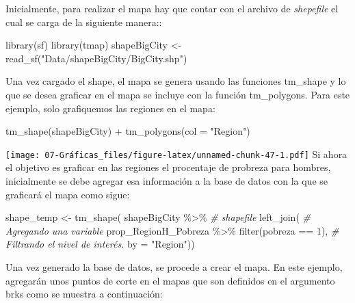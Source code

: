 \documentclass[
  12pt,
]{book}
\newenvironment{Shaded}{\begin{snugshade}}{\end{snugshade}}
\newcommand{\AttributeTok}[1]{\textcolor[rgb]{0.77,0.63,0.00}{#1}}
\newcommand{\CommentTok}[1]{\textcolor[rgb]{0.56,0.35,0.01}{\textit{#1}}}
\newcommand{\DecValTok}[1]{\textcolor[rgb]{0.00,0.00,0.81}{#1}}
\newcommand{\FunctionTok}[1]{\textcolor[rgb]{0.00,0.00,0.00}{#1}}
\newcommand{\NormalTok}[1]{#1}
\newcommand{\OtherTok}[1]{\textcolor[rgb]{0.56,0.35,0.01}{#1}}
\newcommand{\SpecialCharTok}[1]{\textcolor[rgb]{0.00,0.00,0.00}{#1}}
\newcommand{\StringTok}[1]{\textcolor[rgb]{0.31,0.60,0.02}{#1}}
\begin{document}
Inicialmente, para realizar el mapa hay que contar con el archivo de \emph{shepefile} el cual se carga de la siguiente manera::

\begin{Shaded}
\begin{Highlighting}[]
\FunctionTok{library}\NormalTok{(sf)}
\FunctionTok{library}\NormalTok{(tmap)}
\NormalTok{shapeBigCity }\OtherTok{\textless{}{-}} \FunctionTok{read\_sf}\NormalTok{(}\StringTok{"Data/shapeBigCity/BigCity.shp"}\NormalTok{)}
\end{Highlighting}
\end{Shaded}

Una vez cargado el shape, el mapa se genera usando las funciones tm\_shape y lo que se desea graficar en el mapa se incluye con la función tm\_polygons. Para este ejemplo, solo grafiquemos las regiones en el mapa:

\begin{Shaded}
\begin{Highlighting}[]
\FunctionTok{tm\_shape}\NormalTok{(shapeBigCity) }\SpecialCharTok{+} 
  \FunctionTok{tm\_polygons}\NormalTok{(}\AttributeTok{col =} \StringTok{"Region"}\NormalTok{) }
\end{Highlighting}
\end{Shaded}

\texttt{[image: 07-Gráficas\_files/figure-latex/unnamed-chunk-47-1.pdf]}
Si ahora el objetivo es graficar en las regiones el procentaje de probreza para hombres, inicialmente se debe agregar esa información a la base de datos con la que se graficará el mapa como sigue:

\begin{Shaded}
\begin{Highlighting}[]
\NormalTok{shape\_temp }\OtherTok{\textless{}{-}} \FunctionTok{tm\_shape}\NormalTok{(}
\NormalTok{  shapeBigCity }\SpecialCharTok{\%\textgreater{}\%}      \CommentTok{\# shapefile}
    \FunctionTok{left\_join}\NormalTok{(          }\CommentTok{\# Agregando una variable}
\NormalTok{      prop\_RegionH\_Pobreza }\SpecialCharTok{\%\textgreater{}\%}
        \FunctionTok{filter}\NormalTok{(pobreza }\SpecialCharTok{==} \DecValTok{1}\NormalTok{), }\CommentTok{\# Filtrando el nivel de interés. }
      \AttributeTok{by =} \StringTok{"Region"}\NormalTok{))}
\end{Highlighting}
\end{Shaded}

Una vez generado la base de datos, se procede a crear el mapa. En este ejemplo, agregarán unos puntos de corte en el mapas que son definidos en el argumento brks como se muestra a continuación:
\end{document}

